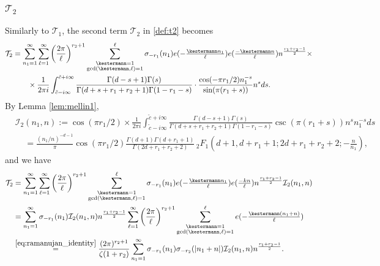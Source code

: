 \documentclass[]{article}
\newcommand{\sumk}{\sum_{\substack{\kestermann = 1 \\ \gcd(\kestermann,\ell) = 1}}^\ell}
\begin{document}
\subsubsection{$\mathcal{T}_2$}\label{sec:T2}
Similarly to $\mathcal{T}_1$,  the second term $\mathcal{T}_2$ in \eqref{def:t2} becomes
\begin{equation}\label{eq:intermediate_identity_in_petersson_backwardsasdssd22312442}
    \begin{split}
      \mathcal{T}_2 
         &  = \sum_{n_1=1}^\infty \sum_{\ell=1}^\infty   \left( \frac{2 \pi }{\ell} \right)^{r_2+1}   \sumk \sigma_{-r_1}(n_1) e(-\tfrac{\kestermann n_1}{\ell}) e(\tfrac{-\kestermann n}{\ell}) n^{ \frac{r_1+r_2-1}{2}} \times  \\
&      \ \ \   \ \ \    \times \frac{1}{2 \pi i}  \int_{\tilde c-i \infty}^{\tilde c+i \infty} \frac{   \Gamma(d-s+1)   \Gamma(s)  }{\Gamma (d+s+r_1+r_2+1) \Gamma(1-r_1-s)  }        \cdot   \frac{ \cos(- \pi r_1/2 )  n_1^{-s}   }{\sin(\pi (r_1+s))} n^{s}  ds .
    \end{split}
\end{equation}
By Lemma \ref{lem:mellin1}, 
\begin{equation}\label{eq:Xi}
    \begin{split}
&   \mathcal{I}_2(n_1, n)   := \cos( \pi r_1/2 )  \times   \frac{1}{2 \pi i}  \int_{\tilde c-i \infty}^{\tilde c+i \infty} \frac{   \Gamma(d-s+1)   \Gamma(s)  }{\Gamma (d+s+r_1+r_2+1) \Gamma(1-r_1-s)  }      \csc(\pi (r_1+s)) n^{s} n_1^{-s}   ds  \\
 & \ \ \ \ \  = \frac{(n_1 / n)^{-d-1}}{\pi} \cos( \pi r_1/2 ) \frac{\Gamma (d+1)  \Gamma (d+r_1+1)}{ \Gamma(2 d+r_1+r_2+2) }    \, _2F _1  \left(d+1,d+r_1+1;2 d+r_1+r_2+2;-\frac{n}{n_1}\right),
    \end{split}
\end{equation}
and we have 
\begin{equation}
    \begin{split}
      \mathcal{T}_2    & =  \sum_{n_1=1}^\infty \sum_{\ell=1}^\infty   \left( \frac{2 \pi }{\ell} \right)^{r_2+1}   \sumk \sigma_{-r_1}(n_1) e(-\tfrac{\kestermann n_1}{\ell}) e(\tfrac{-k n}{\ell}) n^{ \frac{r_1+r_2-1}{2}} \mathcal{I}_2(n_1, n)\\
 &  = \sum_{n_1=1}^\infty  \sigma_{-r_1}(n_1) \mathcal{I}_2(n_1,n) n^{ \frac{r_1+r_2-1}{2}}  \sum_{\ell=1}^\infty   \left( \frac{2 \pi }{\ell} \right)^{r_2+1}   \sumk  e(-\tfrac{\kestermann (n_1+n)}{\ell})   \\
    & \stackrel{\eqref{eq:ramanujan_identity}}{=}  \frac{(2 \pi)^{r_2+1}}{  \zeta(1+r_2) } \sum_{n_1=1}^\infty  \sigma_{-r_1}(n_1) \sigma_{-r_2}(| n_1+n|) \mathcal{I}_2(n_1,n) n^{ \frac{r_1+r_2-1}{2}}. 
    \end{split}
\end{equation}
\end{document}
